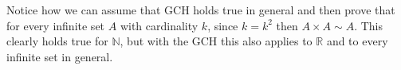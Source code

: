 Notice how we can assume that GCH holds true in general and then prove that for every infinite set $A$ with cardinality 
$k$, since $k = k^2$ then $A \times A \sim A$. This clearly holds true for $\mathbb{N}$, but 
with the GCH this also applies to $\mathbb{R}$ and to every infinite set in general. \newpage